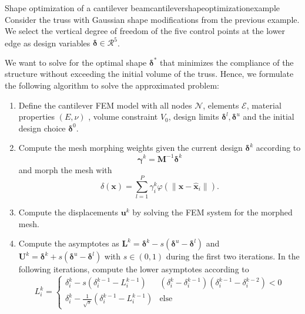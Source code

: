 \begin{example}{Shape optimization of a cantilever beam}{cantilevershapeoptimizationexample}
    Consider the truss with Gaussian shape modifications from the previous example. We select the vertical degree of freedom of the five control points at the lower edge as design variables $\pmb{\delta} \in \mathcal{R}^5$.

    We want to solve for the optimal shape $\pmb{\delta}^*$ that minimizes the compliance of the structure without exceeding the initial volume of the truss. Hence, we formulate the following algorithm to solve the approximated problem: 
    \begin{enumerate}
        \item Define the cantilever FEM model with all nodes $\mathcal{N}$, elements $\mathcal{E}$, material properties $(E, \nu)$ , volume constraint $V_0$, design limits $\pmb{\delta}^l, \pmb{\delta}^u$ and the initial design choice $\pmb{\delta}^0$.
        \item Compute the mesh morphing weights given the current design $\pmb{\delta}^k$ according to
        \begin{equation}
             \pmb{\gamma}^k = \mathbf{M}^{-1}\pmb{\delta}^k 
        \end{equation}
        and morph the mesh with 
        \begin{equation}
            \delta(\mathbf{x}) = \sum_{l=1}^P \gamma_i^k \varphi(\lVert \mathbf{x}-\hat{\mathbf{x}}_i \rVert).
        \end{equation}
        \item Compute the displacements $\mathbf{u}^k$ by solving the FEM system for the morphed mesh.
        \item Compute the asymptotes as $\mathbf{L}^k = \pmb{\delta}^k - s (\pmb{\delta}^u - \pmb{\delta}^l)$ and $\mathbf{U}^k =\pmb{\delta}^k + s (\pmb{\delta}^u - \pmb{\delta}^l)$ with $s \in (0,1)$ during the first two iterations. In the following iterations, compute the lower asymptotes according to 
        \begin{equation}
            L^k_i = 
            \begin{cases}
                \delta^k_i - s  (\delta^{k-1}_i-L^{k-1}_i) & (\delta_i^k-\delta_i^{k-1})(\delta_i^{k-1}-\delta_i^{k-2}) < 0\\
                \delta^k_i - \frac{1}{\sqrt{s}}  (\delta^{k-1}_i-L^{k-1}_i) & \text{else}
            \end{cases}
        \end{equation}

\end{enumerate}
\end{example}

